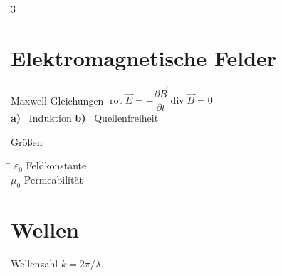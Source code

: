 \documentclass[a4paper,9pt,landscape]{extarticle}
\newcommand{\teil}[1]{\textbf{#1)}~}
\DeclareMathOperator{\rot}{rot}
\begin{document}
\begin{multicols*}{3}
\section*{Elektromagnetische Felder}

\begin{formelbox}{Maxwell-Gleichungen}
$\rot \vec{E} = -\dfrac{\partial \vec{B}}{\partial t}$\quad $\operatorname{div} \vec{B} = 0$\\[2pt]
\teil{a} Induktion \teil{b} Quellenfreiheit
\end{formelbox}

\begin{formelbox}{Größen}
\begin{tabbing}
\hspace*{1.5cm} \= \kill
$\varepsilon_0$ \> Feldkonstante \\
$\mu_0$ \> Permeabilität
\end{tabbing}
\end{formelbox}

\begin{center}
\end{center}

\columnbreak
\section*{Wellen}
Wellenzahl $k = 2\pi/\lambda$.
\end{multicols*}
\end{document}

